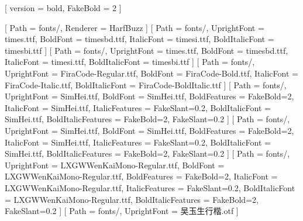 \usepackage{etoolbox}
\makeatletter
{}
\providecommand{\transparent}[1]{}
\makeatother
\usepackage{fontspec}
\usepackage[fontset=none]{ctex}
\usepackage[dvipsnames, svgnames, x11names]{xcolor}
\usepackage[comma, numbers, sort&compress, square]{natbib}
\usepackage{minted}
\usepackage{
    svg,
    xurl,
    ulem,
    forest,
    xpatch,
    amsmath,
    caption,
    booktabs,
    calligra,
    hyperref,
    graphicx,
    listings,
    tabularx,
    adjustbox,
    tcolorbox,
    xltabular
}
\usepackage{unicode-math}
[
    version = bold,
    FakeBold = 2
]
\AtBeginDocument{\renewcommand{\mathbf}{\symbf}}
\allowdisplaybreaks
\usepackage{ZZU}
\usepackage{emoji-ext}

[
    Path = fonts/,
    Renderer = HarfBuzz
]
\setmainfont{Times New Roman}[
    Path = fonts/,
    UprightFont = times.ttf,
    BoldFont = timesbd.ttf,
    ItalicFont = timesi.ttf,
    BoldItalicFont = timesbi.ttf
]
\setsansfont{Times New Roman}[
    Path = fonts/,
    UprightFont = times.ttf,
    BoldFont = timesbd.ttf,
    ItalicFont = timesi.ttf,
    BoldItalicFont = timesbi.ttf
]
\setmonofont{FiraCode}[
    Path = fonts/,
    UprightFont = FiraCode-Regular.ttf,
    BoldFont = FiraCode-Bold.ttf,
    ItalicFont = FiraCode-Italic.ttf,
    BoldItalicFont = FiraCode-BoldItalic.ttf
]
[
    Path = fonts/,
    UprightFont = SimHei.ttf,
    BoldFont = SimHei.ttf,
    BoldFeatures = {FakeBold=2},
    ItalicFont = SimHei.ttf,
    ItalicFeatures = {FakeSlant=0.2},
    BoldItalicFont = SimHei.ttf,
    BoldItalicFeatures = {FakeBold=2, FakeSlant=0.2}
]
[
    Path = fonts/,
    UprightFont = SimHei.ttf,
    BoldFont = SimHei.ttf,
    BoldFeatures = {FakeBold=2},
    ItalicFont = SimHei.ttf,
    ItalicFeatures = {FakeSlant=0.2},
    BoldItalicFont = SimHei.ttf,
    BoldItalicFeatures = {FakeBold=2, FakeSlant=0.2}
]
[
    Path = fonts/,
    UprightFont = LXGWWenKaiMono-Regular.ttf,
    BoldFont = LXGWWenKaiMono-Regular.ttf,
    BoldFeatures = {FakeBold=2},
    ItalicFont = LXGWWenKaiMono-Regular.ttf,
    ItalicFeatures = {FakeSlant=0.2},
    BoldItalicFont = LXGWWenKaiMono-Regular.ttf,
    BoldItalicFeatures = {FakeBold=2, FakeSlant=0.2}
]
\newCJKfontfamily{}[
    Path = fonts/,
    UprightFont = 吴玉生行楷.otf
]

